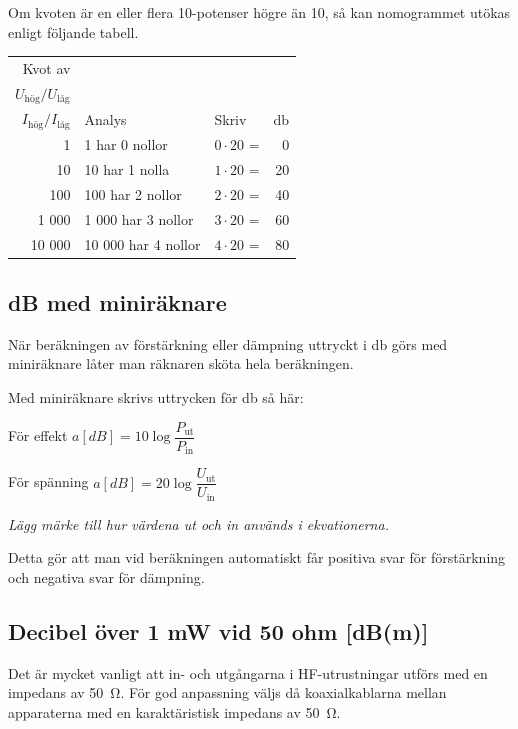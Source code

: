 Om kvoten är en eller flera 10-potenser högre än 10, så kan nomogrammet utökas
enligt följande tabell.

\begin{center}
\begin{tabular}{rllr}
  Kvot av & & & \\
\(U_{\text{hög}}/U_{\text{låg}}\) &          &                  &    \\
\(I_{\text{hög}}/I_{\text{låg}}\) & Analys             & Skriv            & \unit{\decibel} \\
  \hline
     1 & 1 har 0 nollor      & \(0 \cdot 20\) = &  0 \\
    10 & 10 har 1 nolla      & \(1 \cdot 20\) = & 20 \\
   100 & 100 har 2 nollor    & \(2 \cdot 20\) = & 40 \\
 1 000 &  1 000 har 3 nollor & \(3 \cdot 20\) = & 60 \\
10 000 & 10 000 har 4 nollor & \(4 \cdot 20\) = & 80
\end{tabular}
\end{center}

\subsection{dB med miniräknare}

När beräkningen av förstärkning eller dämpning uttryckt i \unit{\decibel} görs
med miniräknare låter man räknaren sköta hela beräkningen.

Med miniräknare skrivs uttrycken för \unit{\decibel} så här:

För effekt \(a[dB] = 10\log \dfrac{P_{\text{ut}}}{P_{\text{in}}}\)

För spänning \(a[dB] = 20\log \dfrac{U_{\text{ut}}}{U_{\text{in}}}\)

\emph{Lägg märke till hur värdena ut och in används i ekvationerna.}

Detta gör att man vid beräkningen automatiskt får positiva svar för
förstärkning och negativa svar för dämpning.

\subsection{Decibel över 1 mW vid 50 ohm [dB(m)]}
\label{dBm}

Det är mycket vanligt att in- och utgångarna i HF-utrustningar utförs
med en impedans av \qty{50}{\ohm}.
För god anpassning väljs då koaxialkablarna mellan apparaterna med en
karaktäristisk impedans av \qty{50}{\ohm}.

